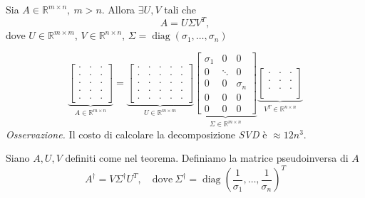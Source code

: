 \begin{theorem}
    Sia $A\in\mathbb R^{m\times n},\ m>n$. Allora $\exists U,V$ tali che 
    \[
    A = U\Sigma V^T,
    \]
    dove $U\in \mathbb R^{m\times m}$, $V\in \mathbb R^{n\times n}$, $\Sigma=\operatorname{diag}(\sigma_1,\dots,\sigma_n)$
\end{theorem}

\begin{equation*}
\underbrace{\begin{bmatrix}
\cdot  & \cdot  & \cdot \\
\cdot  & \cdot  & \cdot \\
\cdot  & \cdot  & \cdot \\
\cdot  & \cdot  & \cdot \\
\cdot  & \cdot  & \cdot
\end{bmatrix}}_{A\in \mathbb{R}^{m\times n}} =\underbrace{\begin{bmatrix}
\cdot  & \cdot  & \cdot  & \cdot  & \cdot \\
\cdot  & \cdot  & \cdot  & \cdot  & \cdot \\
\cdot  & \cdot  & \cdot  & \cdot  & \cdot \\
\cdot  & \cdot  & \cdot  & \cdot  & \cdot \\
\cdot  & \cdot  & \cdot  & \cdot  & \cdot
\end{bmatrix}}_{U\in \mathbb{R}^{m\times m}}\underbrace{\begin{bmatrix}
\sigma_1  & 0  & 0 \\
0 & \ddots  & 0 \\
0 & 0 & \sigma_n \\
0 & 0 & 0\\
0 & 0 & 0
\end{bmatrix}}_{\Sigma\in \mathbb{R}^{m\times n}}
\underbrace{\begin{bmatrix}
    \cdot  & \cdot  & \cdot \\
    \cdot  & \cdot  & \cdot \\
    \cdot  & \cdot  & \cdot \\
\end{bmatrix}}_{V^T\in\mathbb R^{n\times n}}
\end{equation*}
\textit{Osservazione.} Il costo di calcolare la decomposizione \textit{SVD} è $\approx 12 n^3$.

\begin{definition}
    Siano $A,U,V$ definiti come nel teorema. Definiamo la matrice pseudoinversa di $A$
    \[
    A^\dagger =V\Sigma^\dagger U^T,\quad \text{dove} \ \Sigma^\dagger =\operatorname{diag}\left(\frac1{\sigma_1},\dots,\frac1{\sigma_n}\right)^T
    \]
\end{definition}


